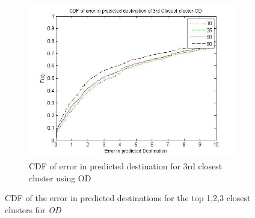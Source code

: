 \begin{figure}
\begin{subfigure}[t]{.5\textwidth}
        \includegraphics[scale=0.4]{figs/od_top3.jpg}
        \caption{CDF of error in predicted destination for 3rd closest cluster using OD}
    \end{subfigure}
    \caption{CDF of the error in predicted destinations for the top 1,2,3 closest clusters for \emph{OD}}
    \label{fig:nextloc_OD}       
\end{figure}

